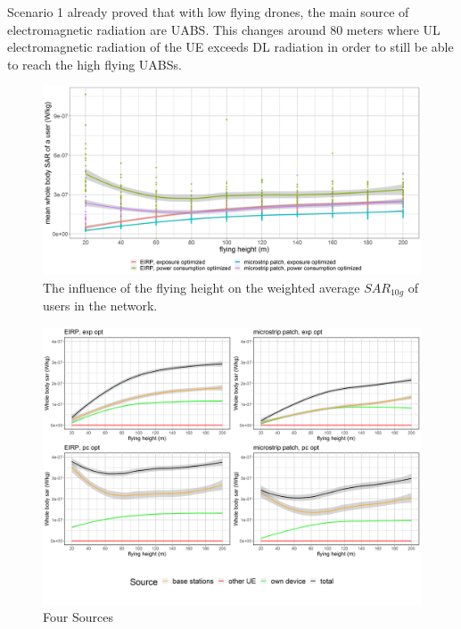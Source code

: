 Scenario 1 already proved that with low flying drones, the main source of electromagnetic radiation are \gls{UABS}. 
This changes around 80 meters where \gls{UL} electromagnetic radiation of the \gls{UE}
 exceeds \gls{DL} radiation in order to still be able to reach the high flying \gls{UABS}s.

\begin{figure}[]
  \includegraphics[width=\textwidth]{../results/s3/fhvssar.png}
  \caption{The influence of the flying height on the weighted average $SAR_{10g}$ of users in the network.}
  \label{fig:s3fhvssar}
\end{figure}

\begin{figure}[]
  \includegraphics[width=\textwidth]{../results/s3/fhFourSources.png}
  \caption{Four Sources}
  \label{fig:s3fhvssar}
\end{figure}

\FloatBarrier

